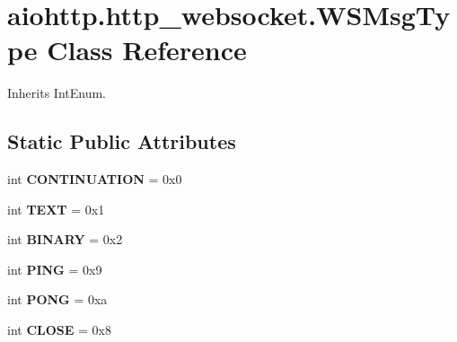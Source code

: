 \hypertarget{classaiohttp_1_1http__websocket_1_1_w_s_msg_type}{}\section{aiohttp.\+http\+\_\+websocket.\+W\+S\+Msg\+Type Class Reference}
\label{classaiohttp_1_1http__websocket_1_1_w_s_msg_type}


Inherits Int\+Enum.

\subsection*{Static Public Attributes}
\begin{DoxyCompactItemize}
\item 
\mbox{\label{classaiohttp_1_1http__websocket_1_1_w_s_msg_type_a9f82bd926a7ea68a97603f1950487303}} 
int {\bfseries C\+O\+N\+T\+I\+N\+U\+A\+T\+I\+ON} = 0x0
\item 
\mbox{\label{classaiohttp_1_1http__websocket_1_1_w_s_msg_type_a581f9c0016346cbfd071d2c2e921ce7d}} 
int {\bfseries T\+E\+XT} = 0x1
\item 
\mbox{\label{classaiohttp_1_1http__websocket_1_1_w_s_msg_type_a257c597cc4186b5264a36f4f795656f9}} 
int {\bfseries B\+I\+N\+A\+RY} = 0x2
\item 
\mbox{\label{classaiohttp_1_1http__websocket_1_1_w_s_msg_type_a6f86526bf0afe7b4aaf757477b289f4b}} 
int {\bfseries P\+I\+NG} = 0x9
\item 
\mbox{\label{classaiohttp_1_1http__websocket_1_1_w_s_msg_type_a2a34e0b4421c312b0537f57ebef00058}} 
int {\bfseries P\+O\+NG} = 0xa
\item 
\mbox{\label{classaiohttp_1_1http__websocket_1_1_w_s_msg_type_a55d407a63ac7e1f51110b3723e8abda8}} 
int {\bfseries C\+L\+O\+SE} = 0x8
\item 
\mbox{\label{classaiohttp_1_1http__websocket_1_1_w_s_msg_type_a8f50c0888d288a5f10f2e3bf1c126a2b}} 

\end{DoxyCompactItemize}
